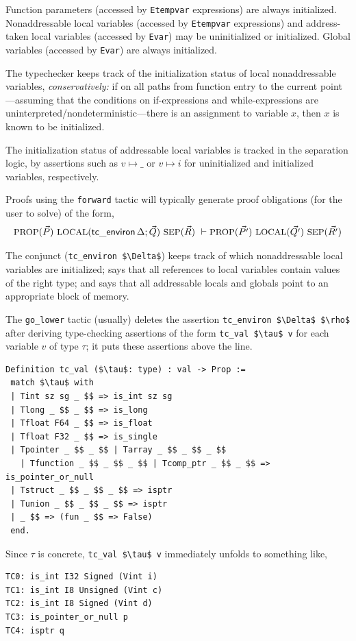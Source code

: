 \documentclass[12pt,fleqn,openany,oneside,showtrims]{memoir}
\begin{document}
Function parameters (accessed by
\lstinline{Etempvar} expressions)
are always initialized.
Nonaddressable local variables (accessed by
\lstinline{Etempvar} expressions) and address-taken local variables
(accessed by \lstinline{Evar})
may be uninitialized or initialized. 
Global variables (accessed by \lstinline{Evar}) are always
initialized.

The typechecker keeps track of the
initialization status of local nonaddressable 
variables, \emph{conservatively:}
if on all paths from function entry to the current
point---assuming that the conditions on if-expressions
and while-expressions are uninterpreted/nondeterministic---there
is an assignment to variable $x$, then $x$ is known to
be initialized.

The initialization status of addressable local variables
is tracked in the separation logic,
by assertions such as $v \mapsto \_$
or $v \mapsto i$ for uninitialized and initialized variables,
respectively.

Proofs using the \lstinline{forward} tactic will typically
generate proof obligations (for the user to solve)
of the form,
\[
\mbox{\small PROP}(\vec{P})~
\mbox{\small LOCAL}(\mathsf{tc\_environ}\,\Delta; \vec{Q})~
\mbox{\small SEP}(\vec{R})
~\vdash
\mbox{\small PROP}(\vec{P'})~
\mbox{\small LOCAL}(\vec{Q'})~
\mbox{\small SEP}(\vec{R'})
\]

The conjunct (\lstinline{tc_environ $\Delta$})
keeps track of which nonaddressable local variables are initialized;
says that all references to local variables
contain values of the right type;
and says that all addressable locals and globals point
to an appropriate block of memory.

The \lstinline{go_lower} tactic
(usually) deletes the assertion 
\lstinline{tc_environ $\Delta$ $\rho$}
after deriving type-checking assertions of the form
\lstinline{tc_val $\tau$ v}
for each variable $v$ of type $\tau$;
it puts these assertions above the line.
\pagebreak
\begin{lstlisting}
Definition tc_val ($\tau$: type) : val -> Prop :=
 match $\tau$ with 
 | Tint sz sg _ $$ => is_int sz sg
 | Tlong _ $$ _ $$ => is_long 
 | Tfloat F64 _ $$ => is_float
 | Tfloat F32 _ $$ => is_single
 | Tpointer _ $$ _ $$ | Tarray _ $$ _ $$ _ $$ 
   | Tfunction _ $$ _ $$ _ $$ | Tcomp_ptr _ $$ _ $$ => is_pointer_or_null
 | Tstruct _ $$ _ $$ _ $$ => isptr
 | Tunion _ $$ _ $$ _ $$ => isptr
 | _ $$ => (fun _ $$ => False)
 end.
\end{lstlisting}
Since $\tau$ is concrete, \lstinline{tc_val $\tau$ v}
immediately unfolds
to something like,
\begin{lstlisting}
TC0: is_int I32 Signed (Vint i)
TC1: is_int I8 Unsigned (Vint c)
TC2: is_int I8 Signed (Vint d)
TC3: is_pointer_or_null p
TC4: isptr q
\end{lstlisting}
\end{document}
